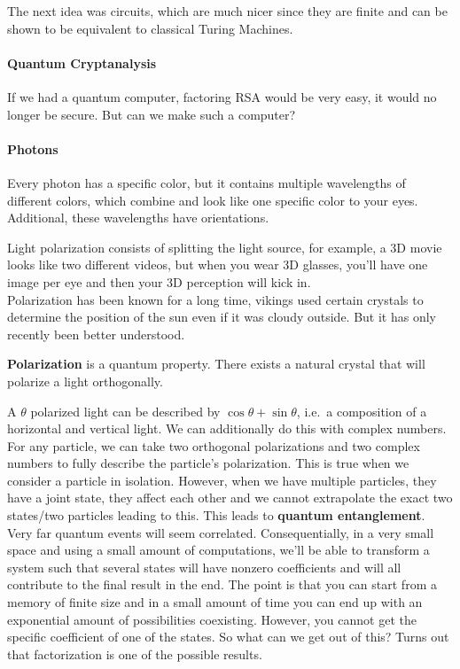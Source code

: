 \documentclass[12 pt]{article}
\begin{document}
The next idea was circuits, which are much nicer since they are finite
and can be shown to be equivalent to classical Turing Machines.
\paragraph{Quantum Cryptanalysis}
If we had a quantum computer, factoring RSA would be very easy, it
would no longer be secure. But can we make such a computer?
\paragraph{Photons} Every photon has a specific color, but it contains
multiple wavelengths of different colors, which combine and look like
one specific color to your eyes. Additional, these wavelengths have
orientations.

Light polarization consists of splitting the light source, for
example, a 3D movie looks like two different videos, but when you wear
3D glasses, you'll have one image per eye and then your 3D perception
will kick in.
\\ Polarization has been known for a long time, vikings used certain
crystals to determine the position of the sun even if it was cloudy
outside. But it has only recently been better understood.

\textbf{Polarization} is a quantum property. There exists a natural
crystal that will polarize a light orthogonally.

A $\theta$ polarized light can be described by $\cos \theta + \sin
\theta$, i.e.\ a composition of a horizontal and vertical light. We
can additionally do this with complex numbers. For any particle, we
can take two orthogonal polarizations and two complex numbers to fully
describe the particle's polarization. This is true when we consider a
particle in isolation. However, when we have multiple particles, they
have a joint state, they affect each other and we cannot extrapolate
the exact two states/two particles leading to this. This leads to \textbf{quantum
  entanglement}. Very far quantum events will seem
correlated. Consequentially, in a very small space and using a small
amount of computations, we'll be able to transform a system such that
several states will have nonzero coefficients and will all contribute
to the final result in the end. The point is that you can start from a
memory of finite size and in a small amount of time you can end up
with an exponential amount of possibilities coexisting. However, you
cannot get the specific coefficient of one of the states. So what can
we get out of this? Turns out that factorization is one of the
possible results.
\end{document}
